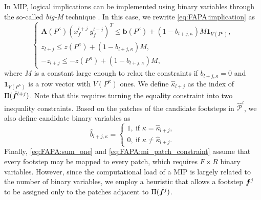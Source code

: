 In MIP, logical implications can be implemented using binary variables through the so-called {\em big-M} technique \cite{Afonso2020TaskAllocationTrajectoryPlanning}. In this case, we rewrite \eqref{eq:FAPA:implication} as
\begin{equation}
	\begin{cases}
		\bm{A}(P^\kappa)\left( x_f^{l+j} \ y_f^{l+j} \right)^T \leq \bm{b}(P^\kappa) + (1 - b_{l+j,\kappa}) M \bm{1}_{V(P^\kappa)}, \\
		z_{l+j} \leq z(P^\kappa) + (1 - b_{l+j,\kappa}) M, \\
		-z_{l+j} \leq -z(P^\kappa) + (1 - b_{l+j,\kappa}) M,
	\end{cases}
\label{eq:FAPA:mi_patch_constraint}
\end{equation}
where $M$ is a constant large enough to relax the constraints if $b_{l+j,\kappa}=0$ and $\bm{1}_{V(P^\kappa)}$ is a row vector with $V(P^\kappa)$ ones. We define $\hat \kappa_{l+j}$ as the index of $\Pi(\hat {{\bm{f}}}^{l+j})$. Note that this requires turning the equality constraint into two inequality constraints. Based on the patches of the candidate footsteps in $\mathcal{\hat P}^l$, we also define candidate binary variables as
\begin{equation*}
\hat b_{l+j,\kappa} =
\begin{cases}
1, \ \text{if } \kappa = \hat \kappa_{l+j}, \\
0, \ \text{if } \kappa \neq \hat \kappa_{l+j}.
\end{cases}
\end{equation*}
Finally, \eqref{eq:FAPA:sum_one} and \eqref{eq:FAPA:mi_patch_constraint} assume that every footstep may be mapped to every patch, which requires $F \times R$ binary variables. However, since the computational load of a MIP is largely related to the number of binary variables, we employ a heuristic that allows a footstep ${\bm{f}}^j$ to be assigned only to the patches adjacent to $\Pi(\hat {{\bm{f}}}^j)$.

